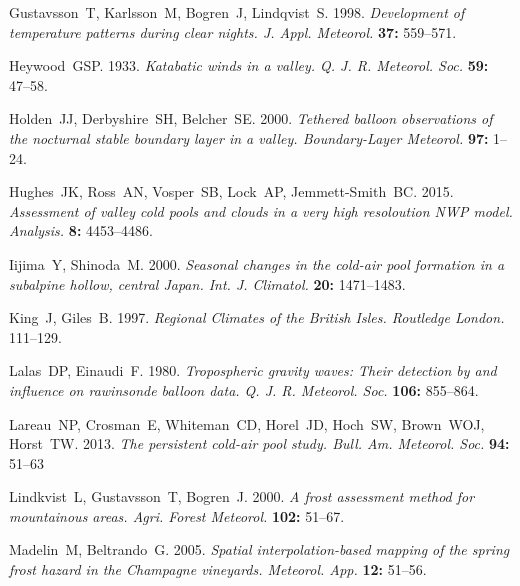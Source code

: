 \documentclass[times]{qjrms4}
\begin{document}
\begin{thebibliography}{99}
Gustavsson~T, Karlsson~M, Bogren~J, Lindqvist~S. 1998. \emph{Development of temperature patterns during clear nights. J. Appl. Meteorol.} {\bf 37:} 559--571.

Heywood~GSP. 1933. \emph{Katabatic winds in a valley. Q. J. R. Meteorol. Soc.} {\bf 59:} 47--58.

Holden~JJ, Derbyshire~SH, Belcher~SE. 2000. \emph{Tethered balloon observations of the nocturnal stable boundary layer in a valley. Boundary-Layer Meteorol.} {\bf 97:} 1--24.

Hughes~JK, Ross~AN, Vosper~SB, Lock~AP, Jemmett-Smith~BC. 2015. \emph{Assessment of valley cold pools and clouds in a very high resoloution NWP model. Analysis.} {\bf 8:} 4453--4486.

Iijima~Y, Shinoda~M. 2000. \emph{Seasonal changes in the cold-air pool formation in a subalpine hollow, central Japan. Int. J. Climatol.} {\bf 20:} 1471--1483.

King~J, Giles~B. 1997. \emph{Regional Climates of the British Isles. Routledge London.} 111--129.


Lalas~DP, Einaudi~F. 1980. \emph{Tropospheric gravity waves: Their detection by and influence on rawinsonde balloon data. Q. J. R. Meteorol. Soc.} {\bf 106:} 855--864.

Lareau~NP, Crosman~E, Whiteman~CD, Horel~JD, Hoch~SW, Brown~WOJ, Horst~TW. 2013. \emph{The persistent cold-air pool study. Bull. Am. Meteorol. Soc.} {\bf 94:} 51--63

Lindkvist~L, Gustavsson~T, Bogren~J. 2000. \emph{A frost assessment method for mountainous areas. Agri. Forest Meteorol.} {\bf 102:} 51--67.

Madelin~M, Beltrando~G. 2005. \emph{Spatial interpolation-based mapping of the spring frost hazard in the Champagne vineyards. Meteorol. App.} {\bf 12:} 51--56.


\end{thebibliography}
\end{document}
